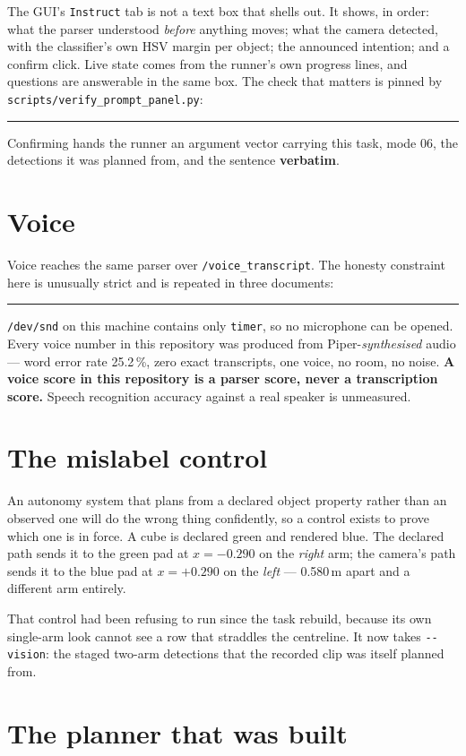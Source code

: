 \documentclass[11pt,a4paper,oneside]{report}
\newcommand{\code}[1]{\texttt{\small #1}}
\newcommand{\file}[1]{\texttt{\small #1}}
\newcommand{\keyfact}[1]{%
  \par\vspace{7pt}\noindent
  \hspace*{0pt}\textcolor{srlblue}{\rule{2.5pt}{\dimexpr\baselineskip\relax}}%
  \hspace{9pt}%
  \begin{minipage}[t]{\dimexpr\textwidth-14pt\relax}
  \small #1
  \end{minipage}\par\vspace{7pt}}
\begin{document}
The GUI's \code{Instruct} tab is not a text box that shells out. It shows, in
order: what the parser understood \emph{before} anything moves; what the camera
detected, with the classifier's own HSV margin per object; the announced
intention; and a confirm click. Live state comes from the runner's own progress
lines, and questions are answerable in the same box. The check that matters is
pinned by \file{scripts/verify\_prompt\_panel.py}:

\keyfact{Confirming hands the runner an argument vector carrying this task,
mode 06, the detections it was planned from, and the sentence \textbf{verbatim}.}

\section{Voice}

Voice reaches the same parser over \code{/voice\_transcript}. The honesty
constraint here is unusually strict and is repeated in three documents:

\keyfact{\file{/dev/snd} on this machine contains only \code{timer}, so no
microphone can be opened. Every voice number in this repository was produced
from Piper-\emph{synthesised} audio --- word error rate 25.2\,\%, zero exact
transcripts, one voice, no room, no noise. \textbf{A voice score in this
repository is a parser score, never a transcription score.} Speech recognition
accuracy against a real speaker is unmeasured.}

\section{The mislabel control}

An autonomy system that plans from a declared object property rather than an
observed one will do the wrong thing confidently, so a control exists to prove
which one is in force. A cube is declared green and rendered blue. The declared
path sends it to the green pad at $x = -0.290$ on the \emph{right} arm; the
camera's path sends it to the blue pad at $x = +0.290$ on the \emph{left} ---
0.580\,m apart and a different arm entirely.

That control had been refusing to run since the task rebuild, because its own
single-arm look cannot see a row that straddles the centreline. It now takes
\code{-{}-vision}: the staged two-arm detections that the recorded clip was
itself planned from.

\section{The planner that was built}
\end{document}
